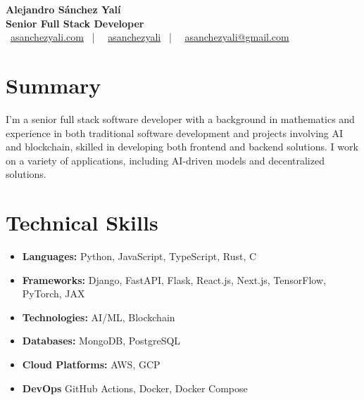\documentclass[letterpaper,11pt]{article}
\begin{document}
\begin{center}
\textbf{\Huge Alejandro Sánchez Yalí}\\[0.3em]
\textbf{\Large Senior Full Stack Developer}\\[0.5em]
\small
\faGlobe\ \href{https://asanchezyali.com}{asanchezyali.com} ~|~
\faLinkedin\ \href{https://www.linkedin.com/in/asanchezyali}{asanchezyali} ~|~
\faEnvelope\ \href{mailto:asanchezyali@gmail.com}{asanchezyali@gmail.com}
\end{center}

\section{Summary}
I'm a senior full stack software developer with a background in mathematics and experience in both traditional software development and projects involving AI and blockchain, skilled in developing both frontend and backend solutions. I work on a variety of applications, including AI-driven models and decentralized solutions.

\section{Technical Skills}
\begin{itemize}[leftmargin=*]
  \item \textbf{Languages:} Python, JavaScript, TypeScript, Rust, C
  \item \textbf{Frameworks:} Django, FastAPI, Flask, React.js, Next.js, TensorFlow, PyTorch, JAX
  \item \textbf{Technologies:} AI/ML, Blockchain
  \item \textbf{Databases:} MongoDB, PostgreSQL
  \item \textbf{Cloud Platforms:} AWS, GCP
  \item \textbf{DevOps} GitHub Actions, Docker, Docker Compose
\end{itemize}
\end{document}
